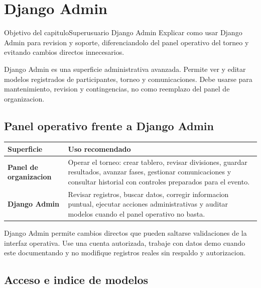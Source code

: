\chapter{Django Admin}
\label{cap:django-admin}

\begin{procedimiento}{Objetivo del capitulo}{Superusuario Django Admin}
Explicar como usar Django Admin para revision y soporte, diferenciandolo del panel operativo del torneo y evitando cambios directos innecesarios.
\end{procedimiento}

Django Admin es una superficie administrativa avanzada. Permite ver y editar modelos registrados de participantes, torneo y comunicaciones. Debe usarse para mantenimiento, revision y contingencias, no como reemplazo del panel de organizacion.

\section{Panel operativo frente a Django Admin}

\begin{tabularx}{\linewidth}{>{\bfseries}p{3.8cm}X}
\toprule
Superficie & Uso recomendado\\
\midrule
Panel de organizacion & Operar el torneo: crear tablero, revisar divisiones, guardar resultados, avanzar fases, gestionar comunicaciones y consultar historial con controles preparados para el evento.\\
Django Admin & Revisar registros, buscar datos, corregir informacion puntual, ejecutar acciones administrativas y auditar modelos cuando el panel operativo no basta.\\
\bottomrule
\end{tabularx}

\begin{operacionsensible}
Django Admin permite cambios directos que pueden saltarse validaciones de la interfaz operativa. Use una cuenta autorizada, trabaje con datos demo cuando este documentando y no modifique registros reales sin respaldo y autorizacion.
\end{operacionsensible}

\section{Acceso e indice de modelos}


